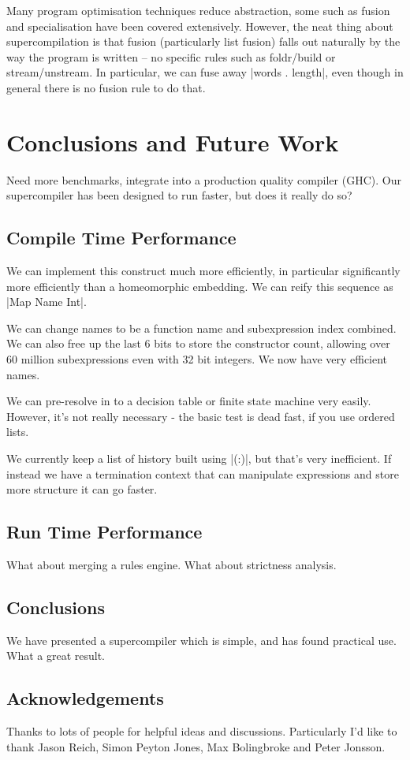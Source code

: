 \documentclass[draft]{sigplanconf}
\begin{document}
Many program optimisation techniques reduce abstraction, some such as fusion and specialisation have been covered extensively. However, the neat thing about supercompilation is that fusion (particularly list fusion) falls out naturally by the way the program is written -- no specific rules such as foldr/build or stream/unstream. In particular, we can fuse away |words . length|, even though in general there is no fusion rule to do that.



\section{Conclusions and Future Work}

Need more benchmarks, integrate into a production quality compiler (GHC). Our supercompiler has been designed to run faster, but does it really do so?

\subsection{Compile Time Performance}

We can implement this construct much more efficiently, in particular significantly more efficiently than a homeomorphic embedding. We can reify this sequence as |Map Name Int|.

We can change names to be a function name and subexpression index combined. We can also free up the last 6 bits to store the constructor count, allowing over 60 million subexpressions even with 32 bit integers. We now have very efficient names.

We can pre-resolve in to a decision table or finite state machine very easily. However, it's not really necessary - the basic test is dead fast, if you use ordered lists.

We currently keep a list of history built using |(:)|, but that's very inefficient. If instead we have a termination context that can manipulate expressions and store more structure it can go faster.

\subsection{Run Time Performance}

What about merging a rules engine. What about strictness analysis.

\subsection{Conclusions}

We have presented a supercompiler which is simple, and has found practical use. What a great result.


\subsection{Acknowledgements}

Thanks to lots of people for helpful ideas and discussions. Particularly I'd like to thank Jason Reich, Simon Peyton Jones, Max Bolingbroke and Peter Jonsson.



\end{document}
